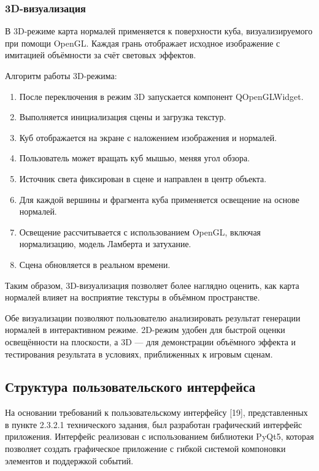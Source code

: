 \subsubsection{3D-визуализация}

В 3D-режиме карта нормалей применяется к поверхности куба, визуализируемого при помощи OpenGL. Каждая грань отображает исходное изображение с имитацией объёмности за счёт световых эффектов.

Алгоритм работы 3D-режима:
\begin{enumerate}
	\item После переключения в режим 3D запускается компонент QOpenGLWidget.
	\item Выполняется инициализация сцены и загрузка текстур.
	\item Куб отображается на экране с наложением изображения и нормалей.
	\item Пользователь может вращать куб мышью, меняя угол обзора.
	\item Источник света фиксирован в сцене и направлен в центр объекта.
	\item Для каждой вершины и фрагмента куба применяется освещение на основе нормалей.
	\item Освещение рассчитывается с использованием OpenGL, включая нормализацию, модель Ламберта и затухание.
	\item Сцена обновляется в реальном времени.
\end{enumerate}

Таким образом, 3D-визуализация позволяет более наглядно оценить, как карта нормалей влияет на восприятие текстуры в объёмном пространстве.

Обе визуализации позволяют пользователю анализировать результат генерации нормалей в интерактивном режиме. 2D-режим удобен для быстрой оценки освещённости на плоскости, а 3D — для демонстрации объёмного эффекта и тестирования результата в условиях, приближенных к игровым сценам.
\subsection{Структура пользовательского интерфейса}

На основании требований к пользовательскому интерфейсу [19], представленных в пункте 2.3.2.1 технического задания, был разработан графический интерфейс приложения. Интерфейс реализован с использованием библиотеки PyQt5, которая позволяет создать графическое приложение с гибкой системой компоновки элементов и поддержкой событий.

